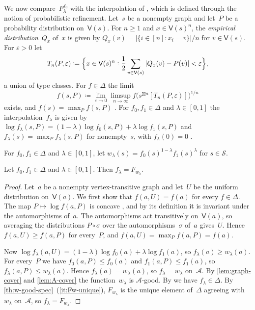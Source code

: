 \documentclass[11pt,letterpaper]{article}
\begin{document}
We now compare~$F^{f_0}_\lambda$ with the interpolation of \cite{MR4357434}, which is defined through the notion of probabilistic refinement. Let~$s$ be a nonempty graph and let~$P$ be a probability distribution on~$\mathsf{V}(s)$. For $n \geq 1$ and $x \in \mathsf{V}(s)^n$, the \emph{empirical distribution}~$Q_x$ of~$x$ is given by $Q_x(v) = |\{i \in [n] : x_i = v\}|/n$ for $v \in \mathsf{V}(s)$. For $\varepsilon > 0$ let
\[
T_n(P,\varepsilon) \coloneqq \Bigl\{ x \in \mathsf{V}(s)^n : \frac{1}{2} \sum_{v \in \mathsf{V}(s)} |Q_x(v) - P(v)| < \varepsilon \Bigr\},
\]
a union of type classes. For $f \in \Delta$ the limit
\[
f(s,P) \coloneqq \lim_{\varepsilon \to 0} \limsup_{n \to \infty} f\bigl( s^{\boxtimes n}[T_n(P,\varepsilon)] \bigr)^{1/n}
\]
exists, and $f(s) = \max_P f(s,P)$ \cite[Theorem~1.1]{MR4357434}. For $f_0, f_1 \in \Delta$ and $\lambda \in [0,1]$ the interpolation~$f_\lambda$ is given by $\log f_\lambda(s,P) = (1-\lambda) \log f_0(s,P) + \lambda \log f_1(s,P)$ and $f_\lambda(s) = \max_P f_\lambda(s,P)$ for nonempty~$s$, with $f_\lambda(0) = 0$ \cite[Section~4.5]{MR4357434}.

For $f_0, f_1 \in \Delta$ and $\lambda \in [0,1]$, let $w_\lambda(s) = f_0(s)^{1-\lambda} f_1(s)^{\lambda}$ for $s \in \mathcal{S}$.

\begin{proposition}\label{prop:graph-vrana}
Let $f_0, f_1 \in \Delta$ and $\lambda \in [0,1]$. Then $f_\lambda = F_{w_\lambda}$.
\end{proposition}
\begin{proof}
Let~$a$ be a nonempty vertex-transitive graph and let~$U$ be the uniform distribution on~$\mathsf{V}(a)$. We first show that $f(a,U) = f(a)$ for every $f \in \Delta$. The map $P \mapsto \log f(a,P)$ is concave \cite[Theorem~1.1]{MR4357434}, and by its definition it is invariant under the automorphisms of~$a$. The automorphisms act transitively on~$\mathsf{V}(a)$, so averaging the distributions $P \circ \sigma$ over the automorphisms~$\sigma$ of~$a$ gives~$U$. Hence $f(a,U) \geq f(a,P)$ for every~$P$, and $f(a,U) = \max_P f(a,P) = f(a)$.

Now $\log f_\lambda(a,U) = (1-\lambda) \log f_0(a) + \lambda \log f_1(a)$, so $f_\lambda(a) \geq w_\lambda(a)$. For every~$P$ we have $f_0(a,P) \leq f_0(a)$ and $f_1(a,P) \leq f_1(a)$, so $f_\lambda(a,P) \leq w_\lambda(a)$. Hence $f_\lambda(a) = w_\lambda(a)$, so $f_\lambda = w_\lambda$ on~$\mathcal{A}$. By \cref{lem:graph-cover} and \cref{lem:A-cover} the function~$w_\lambda$ is $\mathcal{A}$-good. By \cite[Theorem~1.2]{MR4357434} we have $f_\lambda \in \Delta$. By \cref{th:w-good-spec}~(\ref{it:Fw-unique}), $F_{w_\lambda}$ is the unique element of~$\Delta$ agreeing with~$w_\lambda$ on~$\mathcal{A}$, so $f_\lambda = F_{w_\lambda}$.
\end{proof}
\end{document}

